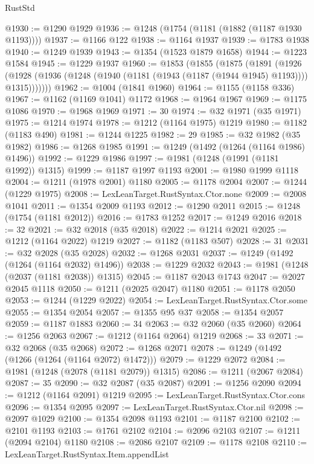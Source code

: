 \begin{lexlean}{RustStd}
\begin{coremodule}
{\begin{coremodule}
{{{{{{{{{{{{{{{{{{{{{{{{{{{{{{{{@1930 := @1290 @1929
@1936 := @1248 (@1754 (@1181 (@1882 (@1187 @1930 @1193))))
@1937 := @1166 @122
@1938 := @1164 @1937
@1939 := @1783 @1938
@1940 := @1249 @1939
@1943 := @1354 (@1523 @1879 @1658)
@1944 := @1223 @1584
@1945 := @1229 @1937
@1960 := @1853
    (@1855
      (@1875
        (@1891
          (@1926
            (@1928 (@1936 (@1248 (@1940 (@1181 (@1943 (@1187 (@1944 @1945) @1193)))) @1315)))))))
@1962 := @1004 (@1841 @1960)
@1964 := @1155 (@1158 @336)
@1967 := @1162 (@1169 @1041) @1172
@1968 := @1964 @1967
@1969 := @1175 @1086
@1970 := @1968 @1969
@1971 := 30
@1974 := @32 @1971 (@35 @1971)
@1975 := @1214 @1974
@1978 := @1212 (@1164 @1975) @1219
@1980 := @1182 (@1183 @490)
@1981 := @1244 @1225
@1982 := 29
@1985 := @32 @1982 (@35 @1982)
@1986 := @1268 @1985
@1991 := @1249 (@1492 (@1264 (@1164 @1986) @1496))
@1992 := @1229 @1986
@1997 := @1981 (@1248 (@1991 (@1181 @1992)) @1315)
@1999 := @1187 @1997 @1193
@2001 := @1980 @1999 @1118
@2004 := @1211 (@1978 @2001) @1180
@2005 := @1178 @2004
@2007 := @1244 (@1229 @1975)
@2008 := LexLeanTarget.RustSyntax.Ctor.none
@2009 := @2008 @1041
@2011 := @1354 @2009 @1193
@2012 := @1290 @2011
@2015 := @1248 (@1754 (@1181 @2012))
@2016 := @1783 @1252
@2017 := @1249 @2016
@2018 := 32
@2021 := @32 @2018 (@35 @2018)
@2022 := @1214 @2021
@2025 := @1212 (@1164 @2022) @1219
@2027 := @1182 (@1183 @507)
@2028 := 31
@2031 := @32 @2028 (@35 @2028)
@2032 := @1268 @2031
@2037 := @1249 (@1492 (@1264 (@1164 @2032) @1496))
@2038 := @1229 @2032
@2043 := @1981 (@1248 (@2037 (@1181 @2038)) @1315)
@2045 := @1187 @2043 @1743
@2047 := @2027 @2045 @1118
@2050 := @1211 (@2025 @2047) @1180
@2051 := @1178 @2050
@2053 := @1244 (@1229 @2022)
@2054 := LexLeanTarget.RustSyntax.Ctor.some
@2055 := @1354 @2054
@2057 := @1355 @95 @37
@2058 := @1354 @2057
@2059 := @1187 @1883
@2060 := 34
@2063 := @32 @2060 (@35 @2060)
@2064 := @1256 @2063
@2067 := @1212 (@1164 @2064) @1219
@2068 := 33
@2071 := @32 @2068 (@35 @2068)
@2072 := @1268 @2071
@2078 := @1249 (@1492 (@1266 (@1264 (@1164 @2072) @1472)))
@2079 := @1229 @2072
@2084 := @1981 (@1248 (@2078 (@1181 @2079)) @1315)
@2086 := @1211 (@2067 @2084)
@2087 := 35
@2090 := @32 @2087 (@35 @2087)
@2091 := @1256 @2090
@2094 := @1212 (@1164 @2091) @1219
@2095 := LexLeanTarget.RustSyntax.Ctor.cons
@2096 := @1354 @2095
@2097 := LexLeanTarget.RustSyntax.Ctor.nil
@2098 := @2097 @1029
@2100 := @1354 @2098 @1193
@2101 := @1187 @2100
@2102 := @2101 @1193
@2103 := @1761 @2102
@2104 := @2096 @2103
@2107 := @1211 (@2094 @2104) @1180
@2108 := @2086 @2107
@2109 := @1178 @2108
@2110 := LexLeanTarget.RustSyntax.Item.appendList
}}}}}}}}}}}}}}}}}}}}}}}}}}}}}}}}
\end{coremodule}}
\end{coremodule}
\end{lexlean}
